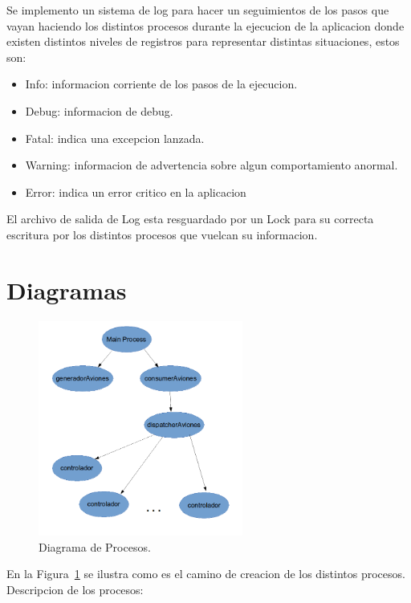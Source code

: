 \documentclass[a4paper,12pt,titlepage]{article}
\begin{document}
Se implemento un sistema de log para hacer un seguimientos de los pasos que vayan haciendo los distintos procesos durante la ejecucion de la aplicacion donde existen distintos niveles de registros para representar distintas situaciones, estos son:
\begin{itemize}
\item Info: informacion corriente de los pasos de la ejecucion.
\item Debug: informacion de debug.
\item Fatal: indica una excepcion lanzada.
\item Warning: informacion de advertencia sobre algun comportamiento anormal.
\item Error: indica un error critico en la aplicacion
\end{itemize}
El archivo de salida de Log esta resguardado por un Lock para su correcta escritura por los distintos procesos que vuelcan su informacion.



\newpage
\section{Diagramas}



\begin{figure}
  \centering
    \includegraphics[width=0.6\textwidth] {dia_procesos_2}
  \caption{Diagrama de Procesos.}
  \label{fig:dia_procesos}
\end{figure}


En la Figura~\ref{fig:dia_procesos} se ilustra como es el camino de creacion de los distintos procesos.
Descripcion de los procesos:
\end{document}
